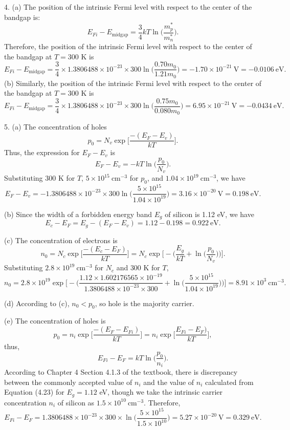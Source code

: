 \documentclass[a4paper]{article}
\begin{document}
4. (a) The position of the intrinsic Fermi level with respect to the center of the bandgap is:
$$E_{Fi}-E_\text{midgap}=\frac{3}{4}kT\ln{\bigg(\frac{m_p^*}{m_n^*}\bigg)}.$$
Therefore, the position of the intrinsic Fermi level with respect to the center of the bandgap at $T=300$ K is
$$E_{Fi}-E_\text{midgap}=\frac{3}{4}\times1.3806488\times10^{-23}\times300\ln{\bigg(\frac{0.70m_0}{1.21m_0}\bigg)}=-1.70\times10^{-21}\ \text{V}=-0.0106\ \text{eV}.$$
(b) Similarly, the position of the intrinsic Fermi level with respect to the center of the bandgap at $T=300$ K is
$$E_{Fi}-E_\text{midgap}=\frac{3}{4}\times1.3806488\times10^{-23}\times300\ln{\bigg(\frac{0.75m_0}{0.080m_0}\bigg)}=6.95\times10^{-21}\ \text{V}=-0.0434\ \text{eV}.$$

5. (a) The concentration of holes
$$p_0=N_v\exp{\bigg[\frac{-(E_F-E_v)}{kT}\bigg]}.$$
Thus, the expression for $E_F-E_v$ is
$$E_F-E_v=-kT\ln{\Big(\frac{p_0}{N_v}\Big)}.$$
Substituting $300$ K for $T$, $5\times10^{15}\ \text{cm}^{-3}$ for $p_0$, and $1.04\times10^{19}\ \text{cm}^{-3}$, we have
$$E_F-E_v=-1.3806488\times10^{-23}\times300\ln{\Big(\frac{5\times10^{15}}{1.04\times10^{19}}\Big)}=3.16\times10^{-20}\ \text{V}=0.198\ \text{eV}.$$

(b) Since the width of a forbidden energy band $E_g$ of silicon is 1.12 eV, we have
$$E_c-E_F=E_g-(E_F-E_v)=1.12-0.198=0.922\ \text{eV}.$$

(c) The concentration of electrons is
$$n_0=N_c\exp{\Big[\frac{-(E_c-E_F)}{kT}\Big]}=N_c\exp{\Big[-\Big(\frac{E_g}{kT}+\ln{\Big(\frac{p_0}{N_v}\Big)}\Big)\Big]}.$$
Substituting $2.8\times10^{19}\ \text{cm}^{-3}$ for $N_c$ and $300$ K for $T$,
$$n_0=2.8\times10^{19}\exp{\Big[-\Big(\frac{1.12\times1.602176565\times10^{-19}}{1.3806488\times10^{-23}\times300}+\ln{\Big(\frac{5\times10^{15}}{1.04\times10^{19}}\Big)}\Big)\Big]}=8.91\times10^{3}\ \text{cm}^{-3}.$$

(d) According to (c), $n_0<p_0$, so $\boxed{\text{hole}}$ is the majority carrier.

(e) The concentration of holes is
$$p_0=n_i\exp{\bigg[\frac{-(E_F-E_{Fi})}{kT}\bigg]}=n_i\exp{\bigg[\frac{E_{Fi}-E_F)}{kT}\bigg]},$$
thus,
$$E_{Fi}-E_F=kT\ln{\Big(\frac{p_0}{n_i}\Big)}.$$
According to Chapter 4 Section 4.1.3 of the textbook, there is discrepancy between the commonly accepted value of $n_i$ and the value of $n_i$ calculated from Equation (4.23) for $E_g=1.12$ eV, though we take the intrinsic carrier concentration $n_i$ of silicon as $1.5\times10^{10}\ \text{cm}^{-3}$. Therefore,
$$E_{Fi}-E_F=1.3806488\times10^{-23}\times300\times\ln{\Big(\frac{5\times10^{15}}{1.5\times10^{10}}\Big)}=5.27\times10^{-20}\ \text{V}=0.329\ \text{eV}.$$
\end{document}
